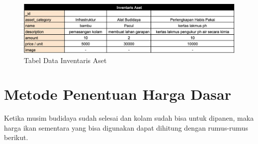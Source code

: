 \begin{spacing}{1.5}
\begin{enumerate}
	\begin{figure}[H]
		\centering
		\includegraphics[width=1\textwidth]{gambar/tabel_inventaris_aset.png}
		\caption{Tabel Data Inventaris Aset}
	\end{figure}	

\end{enumerate}

\section{Metode Penentuan Harga Dasar}

Ketika musim budidaya sudah selesai dan kolam sudah bisa untuk dipanen, maka harga ikan sementara yang bisa digunakan dapat dihitung dengan rumus-rumus berikut.




\end{spacing}
